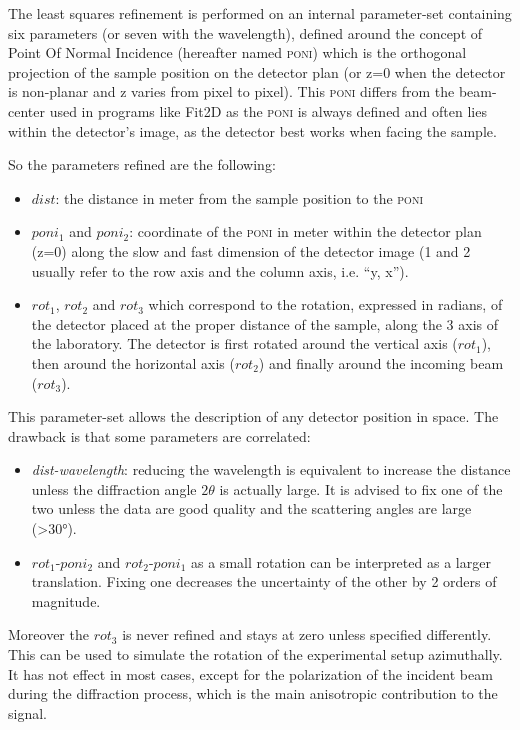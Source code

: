 \documentclass[preprint, pdf]{iucr}              %
\begin{document}
The least squares refinement is performed on an internal parameter-set
containing six  parameters (or seven with the wavelength), defined around the
concept of Point Of Normal Incidence (hereafter named \textsc{poni}) which is
the orthogonal projection  of the sample position on the detector plan 
(or z=0 when the detector is non-planar and z varies from pixel to pixel).
This \textsc{poni} differs from the beam-center used in programs like
Fit2D \cite{fit2d} as the \textsc{poni} is always defined and often lies within
the detector's image, as the detector best works when facing the sample.

So the parameters refined are the following:
\begin{itemize}
  \item $dist$: the distance in meter from the sample position to the
  \textsc{poni}
  \item $poni_1$ and $poni_2$: coordinate of the
  \textsc{poni} in meter within the detector plan (z=0) along the slow and fast
  dimension of the detector image (1 and 2 usually refer to the row axis and
  the column axis, i.e. ``y, x'').
  \item $rot_1$, $rot_2$ and $rot_3$ which correspond to the
  rotation, expressed in radians, of the detector placed at the proper
  distance of the sample, along the 3 axis of the laboratory. The detector is
  first rotated around the vertical axis ($rot_1$), then around the horizontal
  axis ($rot_2$) and finally around the incoming beam ($rot_3$).
\end{itemize}

This parameter-set allows the description of any detector position in space.
The drawback is that some parameters are correlated: 
\begin{itemize}
  \item \textit{dist-wavelength}: reducing the wavelength is equivalent to
  increase the distance unless the diffraction angle $2\theta$ is actually
  large. It is advised to fix one of the two unless the data are good
  quality and the scattering angles are large (>30°).
  \item $rot_1$-$poni_2$ and $rot_2$-$poni_1$ as a small rotation can be
  interpreted as a larger translation. Fixing one decreases the uncertainty of
  the other by 2 orders of magnitude.
\end{itemize}

Moreover the $rot_3$ is never refined and stays at zero unless specified
differently.  This can be used to simulate the rotation of the
experimental setup azimuthally. 
It has not effect in most cases, except for the
polarization of the incident beam during the diffraction process, which is the
main anisotropic contribution to the signal.
\end{document}
